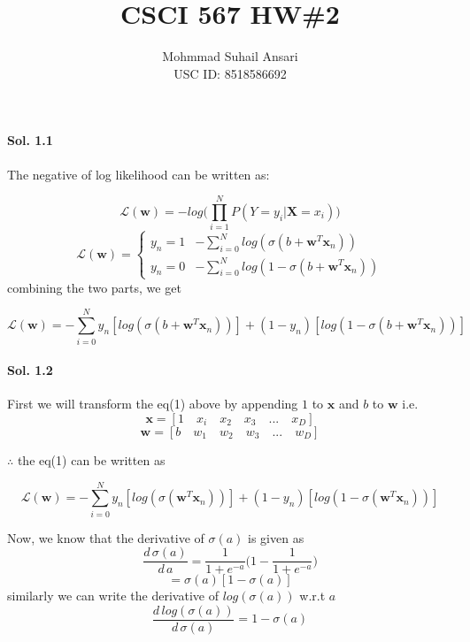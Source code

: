 \documentclass[]{report}
\title{CSCI 567 HW\#2}
\author{Mohmmad Suhail Ansari\\USC ID: 8518586692}
\begin{document}
\maketitle

\newpage

	\paragraph{Sol. 1.1}

		The negative of log likelihood can be written as:

		\[ \mathcal{L}(\textbf{w}) = - log\bigg( \prod_{i=1}^N P(Y= y_i|\textbf{X}=x_i) \bigg) \]
		\[ \mathcal{L}(\textbf{w}) =
			\left\{
				\begin{array}{ll}
					{y_n = 1}  & - \sum_{i = 0}^{N} log(\sigma(b + \textbf{w}^T \textbf{x}_n))\\
					{y_n = 0}  & - \sum_{i = 0}^{N} log(1 - \sigma(b + \textbf{w}^T \textbf{x}_n))
				\end{array}
			\right.
		\]
		combining the two parts, we get

		\begin{equation}
			\mathcal{L}(\textbf{w}) = - \sum_{i = 0}^{N} y_n [log(\sigma(b + \textbf{w}^T \textbf{x}_n))] + (1- y_{n})[log(1 - \sigma(b + \textbf{w}^T \textbf{x}_n))]
		\end{equation}
		

	\paragraph{Sol. 1.2}
		First we will transform the eq(1) above by appending $1$ to $\textbf{x}$ and $b$ to $\textbf{w}$ i.e.
		\[ \textbf{x} = [1 \quad x_i \quad x_2 \quad x_3 \quad ... \quad x_D ]\]
		\[ \textbf{w} = [b \quad w_1 \quad w_2 \quad w_3 \quad ... \quad w_D ]\]
		
		$\therefore$ the eq(1) can be written as 
		
		\begin{equation}
			\mathcal{L}(\textbf{w}) = - \sum_{i = 0}^{N} y_n [log(\sigma(\textbf{w}^T \textbf{x}_n))] + (1- y_{n})[log(1 - \sigma(\textbf{w}^T \textbf{x}_n))]
		\end{equation}

		Now, we know that the derivative of $\sigma(a)$ is given as 
		\[ \frac{d\,\sigma(a)}{d\,a} = \frac{1}{1 + e^{-a}} \bigg( 1 - \frac{1}{1 + e^{-a}} \bigg) \]
		\[ = \sigma(a)[1 - \sigma(a)]\]
		similarly we can write the derivative of $log(\sigma(a))$ w.r.t $a$
		\[ \frac{d \, log(\sigma(a))}{d \, \sigma(a)} = 1 - \sigma(a)\]
\end{document}
